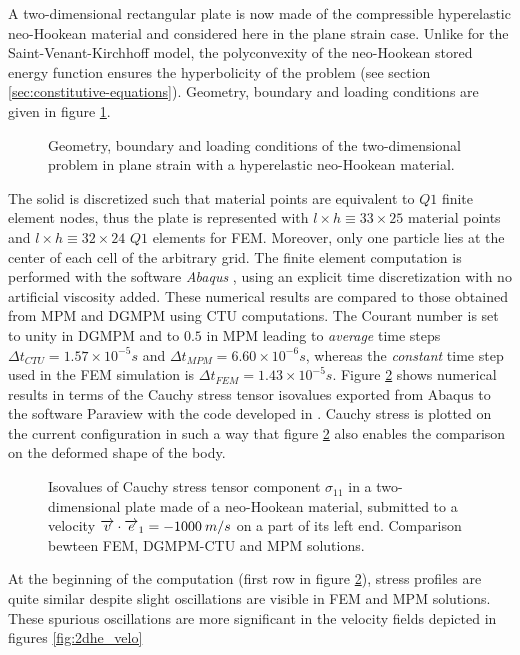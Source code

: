 A two-dimensional rectangular plate is now made of the compressible hyperelastic neo-Hookean material and considered here in the plane strain case. Unlike for the Saint-Venant-Kirchhoff model, the polyconvexity of the neo-Hookean stored energy function ensures the hyperbolicity of the problem (see section \ref{sec:constitutive-equations}).
Geometry, boundary and loading conditions are given in figure \ref{fig:2d_heDomain}.
\begin{figure}[h!]
  \centering
  
  \caption{Geometry, boundary and loading conditions of the two-dimensional problem in plane strain with a hyperelastic neo-Hookean material.}
  \label{fig:2d_heDomain}
\end{figure}

The solid is discretized such that material points are equivalent to $Q1$ finite element nodes, thus the plate is represented with $l \times h \equiv 33 \times 25$ material points and $l \times h \equiv 32 \times 24$ $Q1$ elements for FEM. Moreover, only one particle lies at the center of each cell of the arbitrary grid. The finite element computation is performed with the software \textit{Abaqus} \cite{Abaqus}, using an explicit time discretization with no artificial viscosity added. These numerical results are compared to those obtained from MPM and DGMPM using CTU computations. The Courant number is set to unity in DGMPM and to $0.5$ in MPM leading to \textit{average} time steps $\Delta t_{CTU}=1.57 \times 10^{-5}s$ and $\Delta t_{MPM}=6.60 \times 10^{-6}s$, whereas the \textit{constant} time step used in the FEM simulation is $\Delta t_ {FEM}=1.43 \times 10^{-5} s$. Figure \ref{fig:2dhe_stress} shows numerical results in terms of the Cauchy stress tensor isovalues exported from Abaqus to the software Paraview \cite{Paraview} with the code developed in \cite{Export_Abaqus}. Cauchy stress is plotted on the current configuration in such a way that figure \ref{fig:2dhe_stress} also enables the comparison on the deformed shape of the body.
\begin{figure}[h!]
  \centering
  
  \caption{Isovalues of Cauchy stress tensor component $\sigma_{11}$ in a two-dimensional plate made of a neo-Hookean material, submitted to a velocity ${\overrightarrow{v}}\cdot{\overrightarrow{e}}_1=-1000 \: m/s$ on a part of its left end. Comparison bewteen FEM, DGMPM-CTU and MPM solutions.}
  \label{fig:2dhe_stress}
\end{figure}
At the beginning of the computation (first row in figure \ref{fig:2dhe_stress}), stress profiles are quite similar despite slight oscillations are visible in FEM and MPM solutions. These spurious oscillations are more significant in the velocity fields depicted in figures \ref{fig:2dhe_velo}

